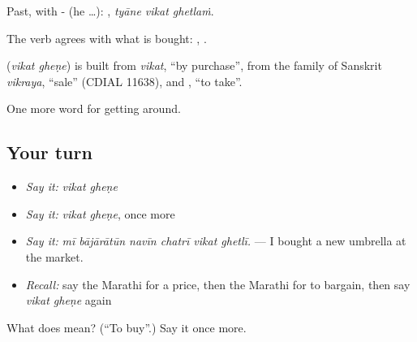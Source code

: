 Past, with - (he …):   , \emph{tyāne vikat ghetlaṁ}.

The verb agrees with what is bought:   ,   .

\begin{cousinweb}
\textbf{ } (\emph{vikat gheṇe}) is built from \emph{vikat}, \textquotedblleft{}by purchase\textquotedblright{}, from the family of Sanskrit \emph{vikraya}, \textquotedblleft{}sale\textquotedblright{} (CDIAL 11638), and \textbf{}, \textquotedblleft{}to take\textquotedblright{}.
\end{cousinweb}

\begin{grammarlens}[title={What you've built}]
One more word for getting around.
\end{grammarlens}

\subsection*{Your turn}
\begin{itemize}
\raggedright
  \item \emph{Say it:} \emph{vikat gheṇe}
  \item \emph{Say it:} \emph{vikat gheṇe}, once more
  \item \emph{Say it:} \emph{mī bājārātūn navīn chatrī vikat ghetlī.} — I bought a new umbrella at the market.
  \item \emph{Recall:} say the Marathi for a price, then the Marathi for to bargain, then say \emph{vikat gheṇe} again
\end{itemize}

\begin{tcolorbox}[breakable,colback=teal!4,colframe=teal!35!black,title={Before you move on}]
What does   mean? (\textquotedblleft{}To buy\textquotedblright{}.) Say it once more.
\end{tcolorbox}
